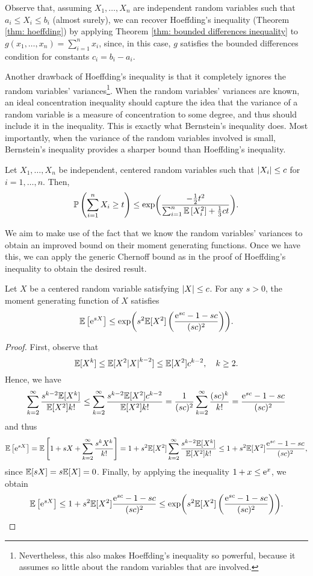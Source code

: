 Observe that, assuming $X_1, \dots, X_n$ are independent random variables such that $a_i \leq X_i \leq b_i$ (almost surely), we can recover Hoeffding's inequality (Theorem \ref{thm: hoeffding}) by applying Theorem \ref{thm: bounded differences inequality} to $g(x_1, \dots, x_n) = \sum_{i=1}^n x_i$, since, in this case, $g$ satisfies the bounded differences condition for constants $c_i = b_i - a_i$.

Another drawback of Hoeffding's inequality is that it completely ignores the random variables' variances\footnote{Nevertheless, this also makes Hoeffding's inequality so powerful, because it assumes so little about the random variables that are involved.}. When the random variables' variances are known, an ideal concentration inequality should capture the idea that the variance of a random variable is a measure of concentration to some degree, and thus should include it in the inequality. This is exactly what Bernstein's inequality does. Most importantly, when the variance of the random variables involved is small, Bernstein's inequality provides a sharper bound than Hoeffding's inequality.

\begin{theorem}
\label{thm: bernstein}
Let $X_1, \dots, X_n$ be independent, centered random variables such that $\abs{X_i} \leq c$ for $i = 1, \dots, n$. Then,
\[
    \mathbb{P}\left(\sum_{i=1}^n X_i \geq t\right) \leq \exp(\frac{-\frac{1}{2}t^2}{\sum_{i=1}^n \mathbb{E}\left[X_i^2\right] + \frac{1}{3}ct}).
\]
\end{theorem}

We aim to make use of the fact that we know the random variables' variances to obtain an improved bound on their moment generating functions. Once we have this, we can apply the generic Chernoff bound as in the proof of Hoeffding's inequality to obtain the desired result.

\begin{lemma}
\label{lem: bernstein}
Let $X$ be a centered random variable satisfying $\abs{X} \leq c$. For any $s > 0$, the moment generating function of $X$ satisfies
\[
    \mathbb{E}\left[\mathrm{e}^{sX}\right] \leq \exp( s^2 \mathbb{E}[X^2] \left( \frac{\mathrm{e}^{sc} - 1 - sc}{(sc)^2} \right) ).
\]
\end{lemma}

\begin{proof}
First, observe that
\[
    \mathbb{E}[X^k] \leq \mathbb{E}[X^2 \abs{X}^{k-2}] \leq \mathbb{E}[X^2] c^{k-2}, \quad k \geq 2.
\]
Hence, we have
\[
    \sum_{k=2}^\infty \frac{s^{k-2} \mathbb{E}[X^k]}{\mathbb{E}[X^2] k!} \leq \sum_{k=2}^\infty \frac{s^{k-2} \mathbb{E}[X^2] c^{k-2}}{\mathbb{E}[X^2] k!} = \frac{1}{(sc)^2} \sum_{k=2}^\infty \frac{(sc)^k}{k!} = \frac{\mathrm{e}^{sc} - 1 - sc}{(sc)^2}
\]
and thus
\[
    \mathbb{E}\left[\mathrm{e}^{sX}\right] = \mathbb{E}\left[1 + sX + \sum_{k=2}^\infty \frac{s^k X^k}{k!}\right] = 1 + s^2 \mathbb{E}[X^2] \sum_{k=2}^\infty \frac{s^{k-2} \mathbb{E}[X^k]}{\mathbb{E}[X^2] k!} \leq 1 + s^2 \mathbb{E}[X^2] \frac{\mathrm{e}^{sc} - 1 - sc}{(sc)^2},
\]
since $\mathbb{E}[sX] = s \mathbb{E}[X] = 0$. Finally, by applying the inequality $1 + x \leq \mathrm{e}^x$, we obtain
\[
    \mathbb{E}\left[\mathrm{e}^{sX}\right] \leq 1 + s^2 \mathbb{E}[X^2] \frac{\mathrm{e}^{sc} - 1 - sc}{(sc)^2} \leq \exp( s^2 \mathbb{E}[X^2] \left( \frac{\mathrm{e}^{sc} - 1 - sc}{(sc)^2} \right) ).
\]
\end{proof}

